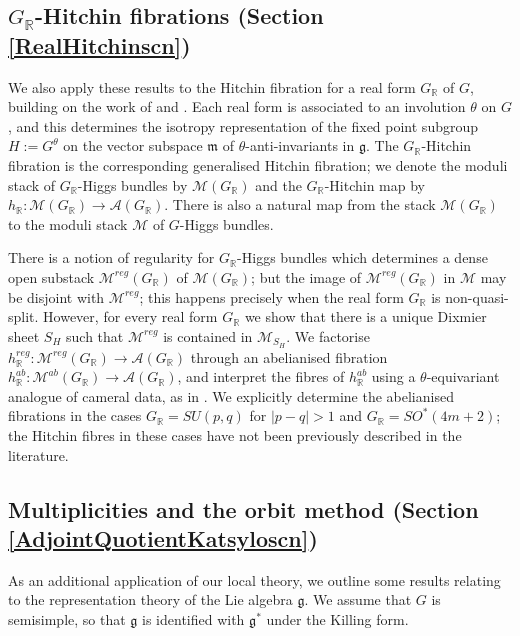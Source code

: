 \documentclass{amsart}
\theoremstyle{remark}
\numberwithin{theorem}{section}
\numberwithin{equation}{section}
\begin{document}
\subsection*{\texorpdfstring{$G_\mathbb{R}$}{GR}-Hitchin fibrations (Section \ref{RealHitchinscn})}
We also apply these results to the Hitchin fibration for a real form $G_\mathbb{R}$ of $G$, building on the work of \cite{GPPN} and \cite{HM}. Each real form is associated to an involution $\theta$ on $G$, and this determines the isotropy representation of the fixed point subgroup $H := G^\theta$ on the vector subspace $\mathfrak{m}$ of $\theta$-anti-invariants in $\mathfrak{g}$. The $G_\mathbb{R}$-Hitchin fibration is the corresponding generalised Hitchin fibration; we denote the moduli stack of $G_\mathbb{R}$-Higgs bundles by $\mathcal M(G_\mathbb{R})$ and the $G_\mathbb{R}$-Hitchin map by $h_\mathbb{R}:\mathcal M(G_\mathbb{R}) \rightarrow \mathcal A(G_\mathbb{R})$. There is also a natural map from the stack $\mathcal M(G_{\mathbb{R}})$ to the moduli stack $\mathcal M$ of $G$-Higgs bundles.

There is a notion of regularity for $G_\mathbb{R}$-Higgs bundles which determines a dense open substack $\mathcal M^{reg}(G_\mathbb{R})$ of $\mathcal M(G_\mathbb{R})$; but the image of $\mathcal M^{reg}(G_\mathbb{R})$ in $\mathcal M$ may be disjoint with $\mathcal M^{reg}$; this happens precisely when the real form $G_\mathbb{R}$ is non-quasi-split. However, for every real form $G_\mathbb{R}$ we show that there is a unique Dixmier sheet $S_H$ such that $\mathcal M^{reg}$ is contained in $\mathcal M_{S_H}$. We factorise $h_\mathbb{R}^{reg}:\mathcal M^{reg}(G_\mathbb{R}) \rightarrow \mathcal A(G_\mathbb{R})$ through an abelianised fibration $h_\mathbb{R}^{ab}:\mathcal M^{ab}(G_\mathbb{R}) \rightarrow \mathcal A(G_\mathbb{R})$, and interpret the fibres of $h_{\mathbb{R}}^{ab}$ using a $\theta$-equivariant analogue of cameral data, as in \cite{GPPN}. We explicitly determine the abelianised fibrations in the cases $G_\mathbb{R} = SU(p,q)$ for $|p-q| > 1$ and $G_\mathbb{R} = SO^*(4m+2)$; the Hitchin fibres in these cases have not been previously described in the literature.

\subsection*{Multiplicities and the orbit method (Section \ref{AdjointQuotientKatsyloscn})} As an additional application of our local theory, we outline some results relating to the representation theory of the Lie algebra $\mathfrak{g}$. We assume that $G$ is semisimple, so that $\mathfrak{g}$ is identified with $\mathfrak{g}^*$ under the Killing form.
\end{document}
